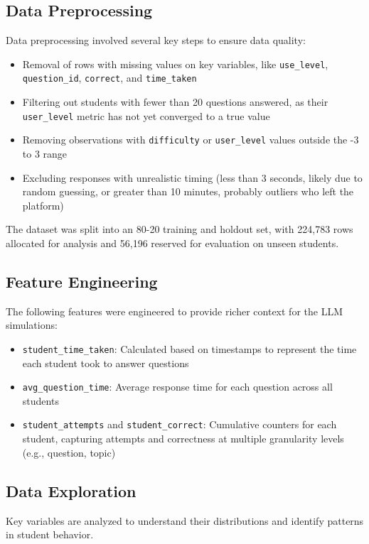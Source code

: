 \documentclass[
    a4paper, %
    10pt, %
    twoside, %
]{LTJournalArticle}
\begin{document}
\subsection{Data Preprocessing}
Data preprocessing involved several key steps to ensure data quality:
\begin{itemize}
    \item Removal of rows with missing values on key variables, like \texttt{use\_level}, \texttt{question\_id}, \texttt{correct}, and \texttt{time\_taken}
    \item Filtering out students with fewer than 20 questions answered, as their \texttt{user\_level} metric has not yet converged to a true value
    \item Removing observations with \texttt{difficulty} or \texttt{user\_level} values outside the -3 to 3 range
    \item Excluding responses with unrealistic timing (less than 3 seconds, likely due to random guessing, or greater than 10 minutes, probably outliers who left the platform)
\end{itemize}

The dataset was split into an 80-20 training and holdout set, with 224,783 rows allocated for analysis and 56,196 reserved for evaluation on unseen students.

\subsection{Feature Engineering}
The following features were engineered to provide richer context for the LLM simulations:

\begin{itemize}
    \item \texttt{student\_time\_taken}: Calculated based on timestamps to represent the time each student took to answer questions
    \item \texttt{avg\_question\_time}: Average response time for each question across all students
    \item \texttt{student\_attempts} and \texttt{student\_correct}: Cumulative counters for each student, capturing attempts and correctness at multiple granularity levels (e.g., question, topic)
\end{itemize}

\subsection{Data Exploration}
Key variables are analyzed to understand their distributions and identify patterns in student behavior.
\end{document}
